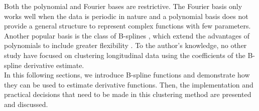 \documentclass[12pt]{article}
\begin{document}
Both the polynomial and Fourier bases are restrictive. The Fourier basis only works well when the data is periodic in nature and a polynomial basis does not provide a general structure to represent complex functions with few parameters. Another popular basis is the class of B-splines \cite{deboor1978, schumaker1981}, which extend the advantages of polynomials to include greater flexibility \cite{abraham2003}. To the author's knowledge, no other study have focused on clustering longitudinal data using the coefficients of the B-spline derivative estimate.\\

In this following sections, we introduce B-spline functions and demonstrate how they can be used to estimate derivative functions. Then, the implementation and practical decisions that need to be made in this clustering method are presented and discussed.
\end{document}
